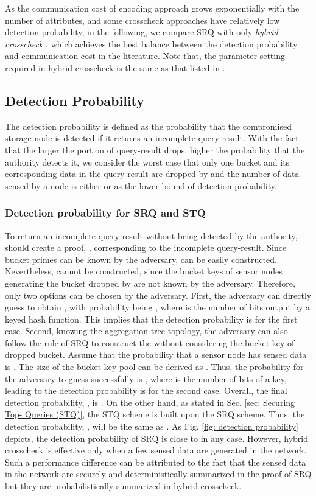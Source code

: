 \documentclass[conference]{IEEEtran}
\begin{document}
As the communication cost of encoding approach \cite{sl08} grows exponentially with the number of attributes, and some crosscheck approaches \cite{szz09,zsz09} have relatively low detection probability, in the following, we compare SRQ with only \emph{hybrid crosscheck} \cite{zsz09}, which achieves the best balance between the detection probability and communication cost in the literature. Note that, the parameter setting required in hybrid crosscheck is the same as that listed in \cite{zsz09}.

\subsection{Detection Probability}\label{sec: Detection Probability}
The detection probability is defined as the probability that the compromised storage node  is detected if it returns an incomplete query-result. With the fact that the larger the portion of query-result  drops, higher the probability that the authority detects it, we consider the worst case that only one bucket and its corresponding data in the query-result are dropped by  and the number of data sensed by a node is either  or  as the lower bound of detection probability.

\subsubsection{Detection probability for SRQ and STQ}\label{sec: Detection probability of SRQ and STQ}
To return an incomplete query-result without being detected by the authority,  should create a proof, , corresponding to the incomplete query-result. Since bucket primes can be known by the adversary,  can be easily constructed. Nevertheless,  cannot be constructed, since the bucket keys of sensor nodes generating the bucket dropped by  are not known by the adversary. Therefore, only two options can be chosen by the adversary. First, the adversary can directly guess to obtain , with probability being , where  is the number of bits output by a keyed hash function. This implies that the detection probability  is  for the first case. Second, knowing the aggregation tree topology, the adversary can also follow the rule of SRQ to construct the  without considering the bucket key of dropped bucket. Assume that the probability that a sensor node has sensed data is . The size of the bucket key pool can be derived as . Thus, the probability for the adversary to guess successfully is , where  is the number of bits of a key, leading to the detection probability  is  for the second case. Overall, the final detection probability, , is . On the other hand, as stated in Sec. \ref{sec: Securing Top- Queries (STQ)}, the STQ scheme is built upon the SRQ scheme. Thus, the detection probability, , will be the same as . As Fig. \ref{fig: detection probability} depicts, the detection probability of SRQ is close to  in any case. However, hybrid crosscheck is effective only when a few sensed data are generated in the network. Such a performance difference can be attributed to the fact that the sensed data in the network are securely and deterministically summarized in the proof of SRQ but they are probabilistically summarized in hybrid crosscheck.
\end{document}
